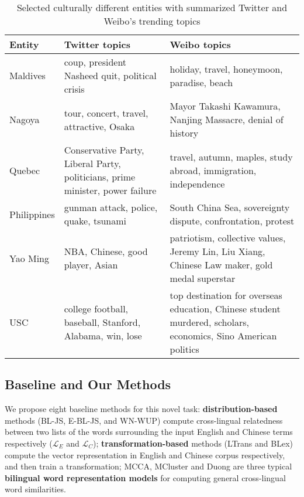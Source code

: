  
\begin{table*}[th!]
	\small
	\centering
	\caption{{Selected culturally different entities with summarized Twitter and Weibo's trending topics }}
	\begin{tabular}{L{1.5cm} L{5cm} L{8cm}}
		\textbf{Entity} & \textbf{Twitter topics} & \textbf{Weibo topics}
		\\ \hline
		Maldives & coup, president Nasheed quit, political crisis & holiday, travel, honeymoon, paradise, beach \\ \hline
		Nagoya & tour, concert, travel, attractive, Osaka & Mayor Takashi Kawamura, Nanjing Massacre, denial of history\\  \hline
				Quebec & Conservative Party, Liberal Party, politicians, prime minister, power failure & travel, autumn, maples, study abroad, immigration, independence   \\ \hline
				Philippines & gunman attack, police, quake, tsunami & South China Sea, sovereignty dispute, confrontation, protest  \\ \hline
		Yao Ming & NBA, Chinese, good player, Asian  & patriotism, collective values, Jeremy Lin, Liu Xiang, Chinese Law maker, gold medal superstar   \\ \hline USC & college football, baseball, Stanford, Alabama, win, lose & top destination for overseas education, 
Chinese student murdered, scholars, economics, Sino American politics \\ \hline
	\end{tabular}
	\label{tab:mcdne_res_4}
\end{table*}
\subsection{Baseline and Our Methods} 
We propose eight baseline methods for this novel task:
\textbf{distribution-based} methods (BL-JS, E-BL-JS, and WN-WUP) compute cross-lingual relatedness between two lists of the words surrounding the input English and Chinese terms respectively ($\mathcal{L}_E$ and $\mathcal{L}_C$);
\textbf{transformation-based} methods (LTrans and BLex) compute the vector representation 
in English and Chinese corpus respectively, and
then train a transformation;
MCCA, MCluster and Duong are three typical \textbf{bilingual word representation models} for computing general cross-lingual word similarities. 


